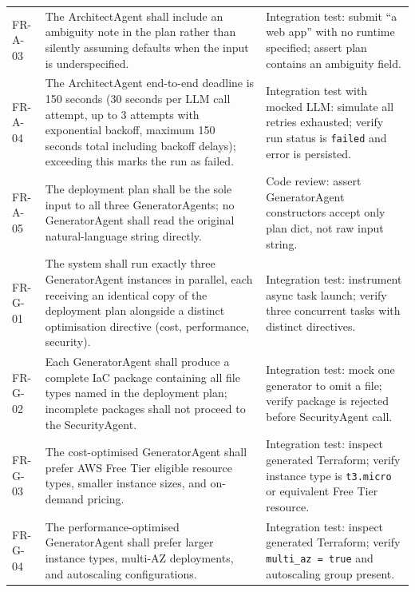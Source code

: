 \begin{longtable}{@{}p{}p{}p{}@{}}
FR-A-03 & The ArchitectAgent shall include an ambiguity note in the plan
  rather than silently assuming defaults when the input is underspecified. &
  Integration test: submit ``a web app'' with no runtime specified;
  assert plan contains an ambiguity field. \\

FR-A-04 & The ArchitectAgent end-to-end deadline is 150 seconds (30 seconds
  per LLM call attempt, up to 3 attempts with exponential backoff, maximum
  150 seconds total including backoff delays); exceeding this marks the run
  as failed. &
  Integration test with mocked LLM: simulate all retries exhausted;
  verify run status is \texttt{failed} and error is persisted. \\

FR-A-05 & The deployment plan shall be the sole input to all three
  GeneratorAgents; no GeneratorAgent shall read the original
  natural-language string directly. &
  Code review: assert GeneratorAgent constructors accept only plan dict,
  not raw input string. \\

\midrule

FR-G-01 & The system shall run exactly three GeneratorAgent instances in
  parallel, each receiving an identical copy of the deployment plan
  alongside a distinct optimisation directive (cost, performance,
  security). &
  Integration test: instrument async task launch; verify three concurrent
  tasks with distinct directives. \\

FR-G-02 & Each GeneratorAgent shall produce a complete IaC package
  containing all file types named in the deployment plan; incomplete
  packages shall not proceed to the SecurityAgent. &
  Integration test: mock one generator to omit a file; verify package
  is rejected before SecurityAgent call. \\

FR-G-03 & The cost-optimised GeneratorAgent shall prefer AWS Free Tier
  eligible resource types, smaller instance sizes, and on-demand pricing. &
  Integration test: inspect generated Terraform; verify instance type
  is \texttt{t3.micro} or equivalent Free Tier resource. \\

FR-G-04 & The performance-optimised GeneratorAgent shall prefer larger
  instance types, multi-AZ deployments, and autoscaling configurations. &
  Integration test: inspect generated Terraform; verify
  \texttt{multi\_az = true} and autoscaling group present. \\


\end{longtable}

